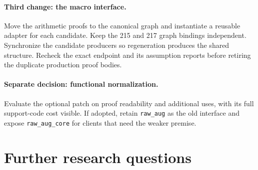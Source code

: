 \documentclass[11pt,letterpaper]{article}
\theoremstyle{definition}\newtheorem{definition}[theorem]{Definition}
\theoremstyle{remark}\newtheorem{remark}[theorem]{Remark}
\newcommand{\code}[1]{\texttt{\small #1}}
\begin{document}
\paragraph{Third change: the macro interface.}
Move the arithmetic proofs to the canonical graph and instantiate a reusable adapter for each candidate. Keep the 215 and 217 graph bindings independent. Synchronize the candidate producers so regeneration produces the shared structure. Recheck the exact endpoint and its assumption reports before retiring the duplicate production proof bodies.

\paragraph{Separate decision: functional normalization.}
Evaluate the optional patch on proof readability and additional uses, with its full support-code cost visible. If adopted, retain \code{raw\_aug} as the old interface and expose \code{raw\_aug\_core} for clients that need the weaker premise.

\section{Further research questions}
\end{document}
